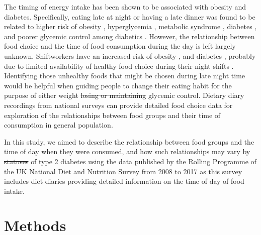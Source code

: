 \documentclass{bmcart}
\providecommand{\DIFadd}[1]{{\protect\color{blue}\uwave{#1}}} %
\providecommand{\DIFdel}[1]{{\protect\color{red}\sout{#1}}}                      %
\providecommand{\DIFaddbegin}{} %
\providecommand{\DIFaddend}{} %
\providecommand{\DIFdelbegin}{} %
\providecommand{\DIFdelend}{} %
\begin{document}
The timing of energy intake has been shown to be associated with obesity and diabetes. \cite{almoosawi2016chrono} Specifically, eating late at night or having a late dinner was found to be related to higher risk of obesity \cite{xiao2019meal,yoshida2018association}, hyperglycemia \cite{nakajima2015association}, metabolic syndrome \cite{kutsuma2014potential}, diabetes \cite{mattson2014meal}, and poorer glycemic control among diabetics \cite{sakai2017late}. However, the relationship between food choice and the time of food consumption during the day is left largely unknown. Shiftworkers have an increased risk of obesity \cite{balieiro2014nutritional,barbadoro2013rotating}, and diabetes \cite{pan2011rotating}, \DIFdelbegin \DIFdel{probably }\DIFdelend \DIFaddbegin \DIFadd{possibly }\DIFaddend due to limited availability of healthy food choice during their night shifts \cite{bonnell2017influences,balieiro2014nutritional}. Identifying those unhealthy foods that might be chosen during late night time would be helpful when guiding people to change their eating habit for the purpose of either weight \DIFdelbegin \DIFdel{losing or maintaining }\DIFdelend \DIFaddbegin \DIFadd{loss or }\DIFaddend glycemic control. Dietary diary recordings from national surveys can provide detailed food choice data for exploration of the relationships between food groups and their time of consumption in \DIFaddbegin \DIFadd{the }\DIFaddend general population.

In this study, we aimed to describe the relationship between food groups and the time of day when they were consumed, and how such relationships may vary by \DIFdelbegin \DIFdel{statuses }\DIFdelend \DIFaddbegin \DIFadd{status }\DIFaddend of type 2 diabetes using the data published by the Rolling Programme of the UK National Diet and Nutrition Survey from 2008 to 2017 as this survey includes diet diaries providing detailed information on the time of day of food intake.

\section*{Methods}
\end{document}
